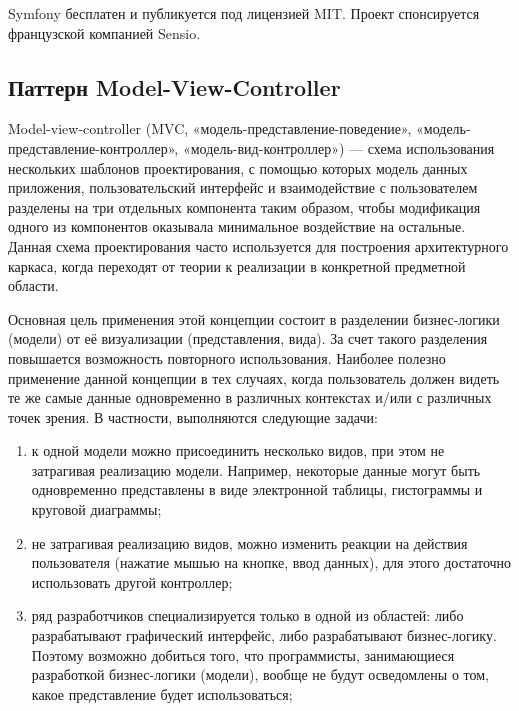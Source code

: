 Symfony бесплатен и публикуется под лицензией MIT. Проект спонсируется французской компанией Sensio.

\subsection{Паттерн  Model-View-Controller}

Model-view-controller (MVC, «модель-представление-поведение», «модель-представление-контроллер», «модель-вид-контроллер») — схема использования нескольких шаблонов проектирования, с помощью которых модель данных приложения, пользовательский интерфейс и взаимодействие с пользователем разделены на три отдельных компонента таким образом, чтобы модификация одного из компонентов оказывала минимальное воздействие на остальные. Данная схема проектирования часто используется для построения архитектурного каркаса, когда переходят от теории к реализации в конкретной предметной области.

Основная цель применения этой концепции состоит в разделении бизнес-логики (модели) от её визуализации (представления, вида). За счет такого разделения повышается возможность повторного использования. Наиболее полезно применение данной концепции в тех случаях, когда пользователь должен видеть те же самые данные одновременно в различных контекстах и/или с различных точек зрения. В частности, выполняются следующие задачи:
\begin{enumerate}
    \item к одной модели можно присоединить несколько видов, при этом не затрагивая реализацию модели. Например, некоторые данные могут быть одновременно представлены в виде электронной таблицы, гистограммы и круговой диаграммы;
    \item не затрагивая реализацию видов, можно изменить реакции на действия пользователя (нажатие мышью на кнопке, ввод данных), для этого достаточно использовать другой контроллер;
    \item ряд разработчиков специализируется только в одной из областей: либо разрабатывают графический интерфейс, либо разрабатывают бизнес-логику. Поэтому возможно добиться того, что программисты, занимающиеся разработкой бизнес-логики (модели), вообще не будут осведомлены о том, какое представление будет использоваться;
\end{enumerate}

